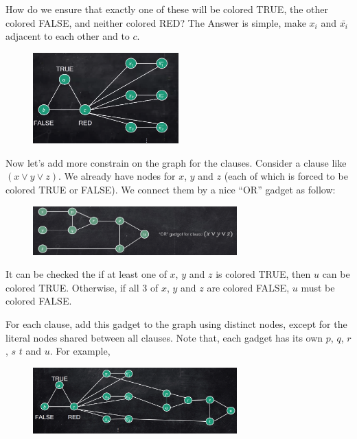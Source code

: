 How do we ensure that exactly one of these will be colored TRUE, the other colored FALSE, and neither colored RED? The Answer is simple, make $x_i$ and $\bar{x_i}$ adjacent to each other and to $c$.

\begin{figure}[H]
	\centering
	\includegraphics[width=0.5\textwidth]{fig/3-col.png}
\end{figure}

Now let's add more constrain on the graph for the clauses. Consider a clause like $(x \vee y \vee z)$. We already have nodes for $x$, $y$ and $z$ (each of which is forced to be colored TRUE or FALSE). We connect them by a nice ``OR'' gadget as follow:

\begin{figure}[H]
	\centering
	\includegraphics[width=0.7\textwidth]{fig/3-col-or-gadget.png}
\end{figure}

It can be checked the if at least one of $x$, $y$ and $z$ is colored TRUE, then $u$ can be colored TRUE. Otherwise, if all 3 of $x$, $y$ and $z$ are colored FALSE, $u$ must be colored FALSE.

For each clause, add this gadget to the graph using distinct nodes, except for the literal nodes shared between all clauses. Note that, each gadget has its own $p$, $q$, $r$, $s$ $t$ and $u$. For example,

\begin{figure}[H]
	\centering
	\includegraphics[width=0.7\textwidth]{fig/3-col-or-gadget-in-graph.png}
\end{figure}

